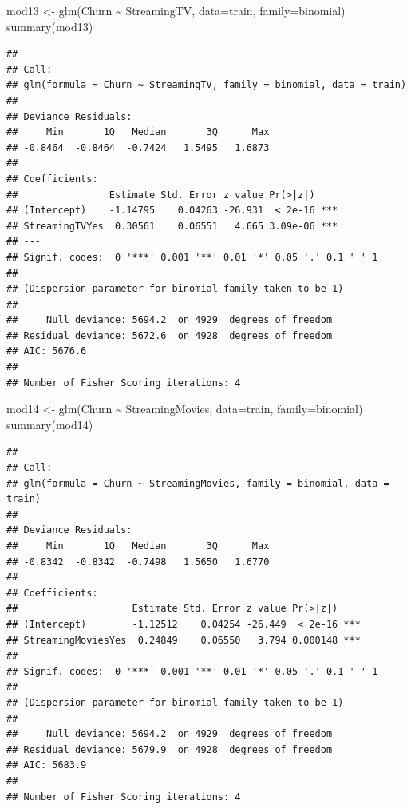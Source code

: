 \documentclass[
  twoside]{article}
\newenvironment{Shaded}{\begin{snugshade}}{\end{snugshade}}
\newcommand{\AttributeTok}[1]{\textcolor[rgb]{0.77,0.63,0.00}{#1}}
\newcommand{\FunctionTok}[1]{\textcolor[rgb]{0.00,0.00,0.00}{#1}}
\newcommand{\NormalTok}[1]{#1}
\newcommand{\OtherTok}[1]{\textcolor[rgb]{0.56,0.35,0.01}{#1}}
\newcommand{\SpecialCharTok}[1]{\textcolor[rgb]{0.00,0.00,0.00}{#1}}
\begin{document}
\begin{Shaded}
\begin{Highlighting}[]
\NormalTok{mod13 }\OtherTok{\textless{}{-}} \FunctionTok{glm}\NormalTok{(Churn }\SpecialCharTok{\textasciitilde{}}\NormalTok{ StreamingTV, }\AttributeTok{data=}\NormalTok{train, }\AttributeTok{family=}\NormalTok{binomial)}
\FunctionTok{summary}\NormalTok{(mod13)}
\end{Highlighting}
\end{Shaded}

\begin{verbatim}
## 
## Call:
## glm(formula = Churn ~ StreamingTV, family = binomial, data = train)
## 
## Deviance Residuals: 
##     Min       1Q   Median       3Q      Max  
## -0.8464  -0.8464  -0.7424   1.5495   1.6873  
## 
## Coefficients:
##                Estimate Std. Error z value Pr(>|z|)    
## (Intercept)    -1.14795    0.04263 -26.931  < 2e-16 ***
## StreamingTVYes  0.30561    0.06551   4.665 3.09e-06 ***
## ---
## Signif. codes:  0 '***' 0.001 '**' 0.01 '*' 0.05 '.' 0.1 ' ' 1
## 
## (Dispersion parameter for binomial family taken to be 1)
## 
##     Null deviance: 5694.2  on 4929  degrees of freedom
## Residual deviance: 5672.6  on 4928  degrees of freedom
## AIC: 5676.6
## 
## Number of Fisher Scoring iterations: 4
\end{verbatim}

\begin{Shaded}
\begin{Highlighting}[]
\NormalTok{mod14 }\OtherTok{\textless{}{-}} \FunctionTok{glm}\NormalTok{(Churn }\SpecialCharTok{\textasciitilde{}}\NormalTok{ StreamingMovies, }\AttributeTok{data=}\NormalTok{train, }\AttributeTok{family=}\NormalTok{binomial)}
\FunctionTok{summary}\NormalTok{(mod14)}
\end{Highlighting}
\end{Shaded}

\begin{verbatim}
## 
## Call:
## glm(formula = Churn ~ StreamingMovies, family = binomial, data = train)
## 
## Deviance Residuals: 
##     Min       1Q   Median       3Q      Max  
## -0.8342  -0.8342  -0.7498   1.5650   1.6770  
## 
## Coefficients:
##                    Estimate Std. Error z value Pr(>|z|)    
## (Intercept)        -1.12512    0.04254 -26.449  < 2e-16 ***
## StreamingMoviesYes  0.24849    0.06550   3.794 0.000148 ***
## ---
## Signif. codes:  0 '***' 0.001 '**' 0.01 '*' 0.05 '.' 0.1 ' ' 1
## 
## (Dispersion parameter for binomial family taken to be 1)
## 
##     Null deviance: 5694.2  on 4929  degrees of freedom
## Residual deviance: 5679.9  on 4928  degrees of freedom
## AIC: 5683.9
## 
## Number of Fisher Scoring iterations: 4
\end{verbatim}
\end{document}
